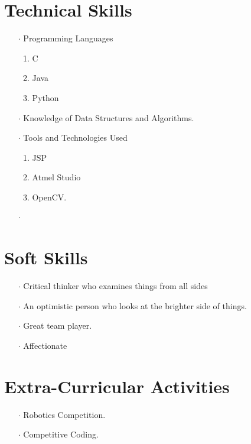 \documentclass[12pt]{article}
\begin{document}
\section*{Technical Skills}
\begin{itemize}
\item[$\cdot$]Programming Languages
\begin{enumerate}
\item C
\item Java
\item Python
\end{enumerate}
\item[$\cdot$]Knowledge of Data Structures and Algorithms.
\item[$\cdot$]Tools and Technologies Used
\begin{enumerate}
\item JSP
\item Atmel Studio
\item OpenCV.
\end{enumerate}
\end{itemize}
\begin{itemize}
\item[$\cdot$]
\end{itemize}
\section*{Soft Skills}
\begin{itemize}
\item[$\cdot$] Critical thinker who examines things from all sides
\item[$\cdot$]An optimistic person who looks at the brighter side of things.
\item[$\cdot$]Great team player.
\item[$\cdot$]Affectionate 
\end{itemize}
\section*{Extra-Curricular Activities}
\begin{itemize}
\item[$\cdot$]Robotics Competition.
\item[$\cdot$]Competitive Coding.
\end{itemize}
\end{document}
